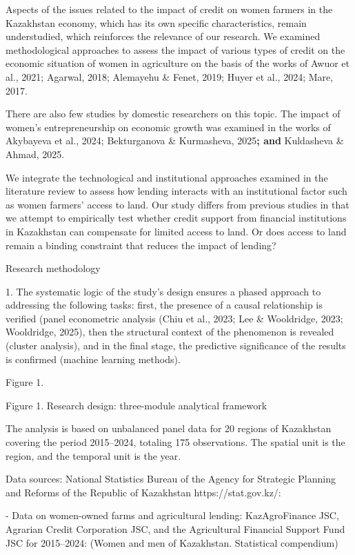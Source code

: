 \documentclass[
]{article}
\begin{document}
Aspects of the issues related to the impact of credit on women farmers
in the Kazakhstan economy, which has its own specific characteristics,
remain understudied, which reinforces the relevance of our research. We
examined methodological approaches to assess the impact of various types
of credit on the economic situation of women in agriculture on the basis
of the works of Awuor et al., 2021; Agarwal, 2018; Alemayehu \& Fenet,
2019; Huyer et al., 2024; Mare, 2017.

There are also few studies by domestic researchers on this topic. The
impact of women's entrepreneurship on economic growth was examined in
the works of Akybayeva et al., 2024; Bekturganova \& Kurmasheva,
2025\textbf{; and} Kuldasheva \& Ahmad, 2025.

We integrate the technological and institutional approaches examined in
the literature review to assess how lending interacts with an
institutional factor such as women farmers' access to land. Our study
differs from previous studies in that we attempt to empirically test
whether credit support from financial institutions in Kazakhstan can
compensate for limited access to land. Or does access to land remain a
binding constraint that reduces the impact of lending?

Research methodology

1. The systematic logic of the study's design ensures a phased approach
to addressing the following tasks: first, the presence of a causal
relationship is verified (panel econometric analysis (Chiu et al., 2023;
Lee \& Wooldridge, 2023; Wooldridge, 2025), then the structural context
of the phenomenon is revealed (cluster analysis), and in the final
stage, the predictive significance of the results is confirmed (machine
learning methods).

Figure 1.

Figure 1. Research design: three-module analytical framework

The analysis is based on unbalanced panel data for 20 regions of
Kazakhstan covering the period 2015--2024, totaling 175 observations.
The spatial unit is the region, and the temporal unit is the year.

Data sources: National Statistics Bureau of the Agency for Strategic
Planning and Reforms of the Republic of Kazakhstan https://stat.gov.kz/:

- Data on women-owned farms and agricultural lending: KazAgroFinance
JSC, Agrarian Credit Corporation JSC, and the Agricultural Financial
Support Fund JSC for 2015--2024: (Women and men of Kazakhstan.
Statistical compendium)
\end{document}
